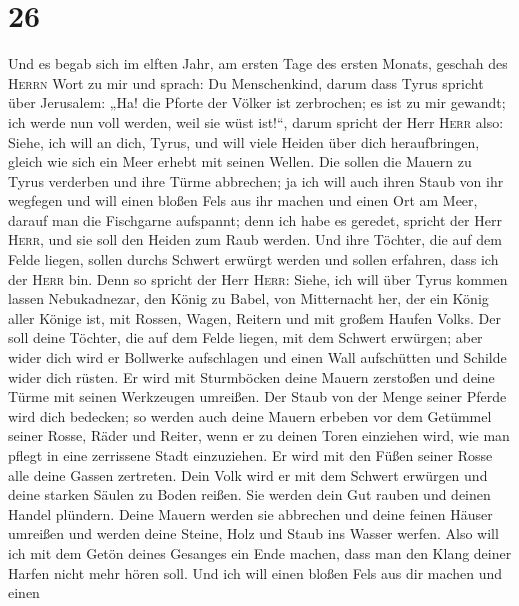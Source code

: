 \hypertarget{section-25}{%
\section{26}\label{section-25}}

 Und es begab sich im elften Jahr, am ersten Tage des
ersten Monats, geschah des \textsc{Herrn} Wort zu mir und sprach:
 Du Menschenkind, darum dass Tyrus spricht über Jerusalem:
„Ha! die Pforte der Völker ist zerbrochen; es ist zu mir gewandt; ich
werde nun voll werden, weil sie wüst ist!{}``,  darum
spricht der Herr \textsc{Herr} also: Siehe, ich will an dich, Tyrus, und
will viele Heiden über dich heraufbringen, gleich wie sich ein Meer
erhebt mit seinen Wellen.  Die sollen die Mauern zu Tyrus
verderben und ihre Türme abbrechen; ja ich will auch ihren Staub von ihr
wegfegen und will einen bloßen Fels aus ihr machen  und
einen Ort am Meer, darauf man die Fischgarne aufspannt; denn ich habe es
geredet, spricht der Herr \textsc{Herr}, und sie soll den Heiden zum
Raub werden.  Und ihre Töchter, die auf dem Felde liegen,
sollen durchs Schwert erwürgt werden und sollen erfahren, dass ich der
\textsc{Herr} bin.  Denn so spricht der Herr
\textsc{Herr}: Siehe, ich will über Tyrus kommen lassen Nebukadnezar,
den König zu Babel, von Mitternacht her, der ein König aller Könige ist,
mit Rossen, Wagen, Reitern und mit großem Haufen Volks. 
Der soll deine Töchter, die auf dem Felde liegen, mit dem Schwert
erwürgen; aber wider dich wird er Bollwerke aufschlagen und einen Wall
aufschütten und Schilde wider dich rüsten.  Er wird mit
Sturmböcken deine Mauern zerstoßen und deine Türme mit seinen Werkzeugen
umreißen.  Der Staub von der Menge seiner Pferde wird
dich bedecken; so werden auch deine Mauern erbeben vor dem Getümmel
seiner Rosse, Räder und Reiter, wenn er zu deinen Toren einziehen wird,
wie man pflegt in eine zerrissene Stadt einzuziehen.  Er
wird mit den Füßen seiner Rosse alle deine Gassen zertreten. Dein Volk
wird er mit dem Schwert erwürgen und deine starken Säulen zu Boden
reißen.  Sie werden dein Gut rauben und deinen Handel
plündern. Deine Mauern werden sie abbrechen und deine feinen Häuser
umreißen und werden deine Steine, Holz und Staub ins Wasser werfen.
 Also will ich mit dem Getön deines Gesanges ein Ende
machen, dass man den Klang deiner Harfen nicht mehr hören soll.
 Und ich will einen bloßen Fels aus dir machen und einen
